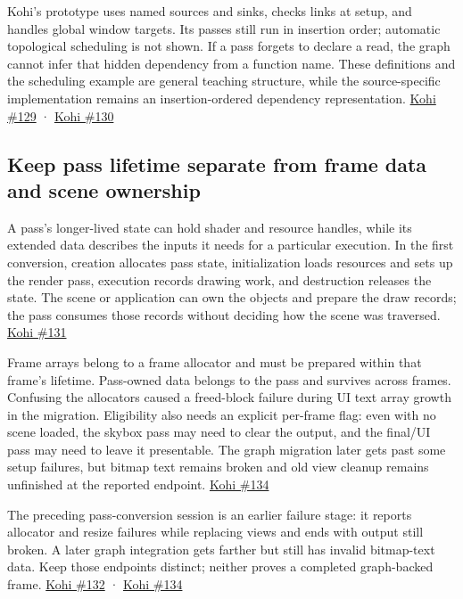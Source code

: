 Kohi's prototype uses named sources and sinks, checks links at setup, and handles global window targets. Its passes still run in insertion order; automatic topological scheduling is not shown. If a pass forgets to declare a read, the graph cannot infer that hidden dependency from a function name. These definitions and the scheduling example are general teaching structure, while the source-specific implementation remains an insertion-ordered dependency representation. \href{https://www.youtube.com/watch?v=oPvx_v1RGvs}{Kohi \#129} · \href{https://www.youtube.com/watch?v=zxB7Ug95G08}{Kohi \#130}

\subsection{Keep pass lifetime separate from frame data and scene ownership}\label{06-engine-ii-ch026-keep-pass-lifetime-separate-from-frame-data-and-scene-ownership}

A pass's longer-lived state can hold shader and resource handles, while its extended data describes the inputs it needs for a particular execution. In the first conversion, creation allocates pass state, initialization loads resources and sets up the render pass, execution records drawing work, and destruction releases the state. The scene or application can own the objects and prepare the draw records; the pass consumes those records without deciding how the scene was traversed. \href{https://www.youtube.com/watch?v=lFl_jtkfEDg}{Kohi \#131}

Frame arrays belong to a frame allocator and must be prepared within that frame's lifetime. Pass-owned data belongs to the pass and survives across frames. Confusing the allocators caused a freed-block failure during UI text array growth in the migration. Eligibility also needs an explicit per-frame flag: even with no scene loaded, the skybox pass may need to clear the output, and the final/UI pass may need to leave it presentable. The graph migration later gets past some setup failures, but bitmap text remains broken and old view cleanup remains unfinished at the reported endpoint. \href{https://www.youtube.com/watch?v=AR6c1Bn57G4}{Kohi \#134}

The preceding pass-conversion session is an earlier failure stage: it reports allocator and resize failures while replacing views and ends with output still broken. A later graph integration gets farther but still has invalid bitmap-text data. Keep those endpoints distinct; neither proves a completed graph-backed frame. \href{https://www.youtube.com/watch?v=qxGXHap7GU0}{Kohi \#132} · \href{https://www.youtube.com/watch?v=AR6c1Bn57G4}{Kohi \#134}

